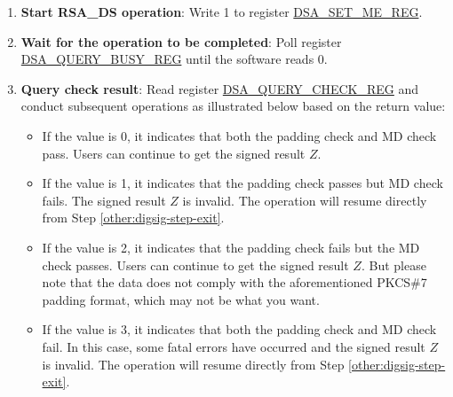 \documentclass[main\_\_EN.tex]{subfiles}
\begin{document}
\begin{enumerate}
\begin{itemize}
    \end{itemize}


    \item {\bfseries Start RSA\_DS operation}: Write 1 to register \hyperref[regdesc:DSASETMEREG]{DSA\_SET\_ME\_REG}.

    \item {\bfseries Wait for the operation to be completed}: Poll register \hyperref[regdesc:DSAQUERYBUSYREG]{DSA\_QUERY\_BUSY\_REG} until the software reads 0.

    \item {\bfseries Query check result}: Read register \hyperref[regdesc:DSAQUERYCHECKREG]{DSA\_QUERY\_CHECK\_REG} and conduct subsequent operations as illustrated below based on the return value:

    \begin{itemize}

        \item If the value is 0, it indicates that both the padding check and MD check pass. Users can continue to get the signed result \begin{math}Z\end{math}.

        \item If the value is 1, it indicates that the padding check passes but MD check fails. The signed result \begin{math}Z\end{math} is invalid. The operation will resume directly from Step \ref{other:digsig-step-exit}.

        \item If the value is 2, it indicates that the padding check fails but the MD check passes. Users can continue to get the signed result \begin{math}Z\end{math}. But please note that the data does not comply with the aforementioned PKCS\#7 padding format, which may not be what you want.

        \item If the value is 3, it indicates that both the padding check and MD check fail. In this case, some fatal errors have occurred and the signed result \begin{math}Z\end{math} is invalid. The operation will resume directly from Step \ref{other:digsig-step-exit}.

    \end{itemize}


\end{enumerate}
\end{document}
